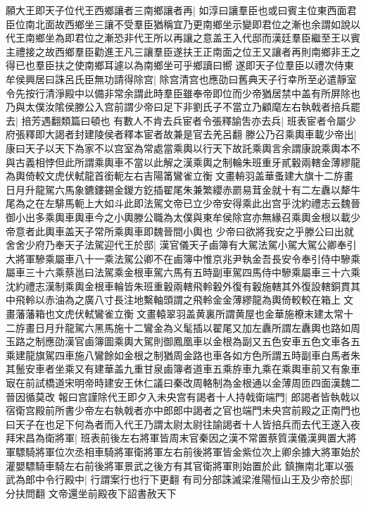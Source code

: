 願大王即天子位代王西鄉讓者三南鄉讓者再|{
	如淳曰讓羣臣也或曰賓主位東西面君臣位南北面故西鄉坐三讓不受羣臣猶稱宜乃更南鄉坐示變即君位之漸也余謂如說以代王南鄉坐為即君位之漸恐非代王所以再讓之意盖王入代邸而漢廷羣臣繼至王以賓主禮接之故西鄉羣臣勸進王凡三讓羣臣遂扶王正南面之位王又讓者再則南鄉非王之得已也羣臣扶之使南鄉耳遽以為南鄉坐可乎鄉讀曰嚮}
遂即天子位羣臣以禮次侍東牟侯興居曰誅呂氏臣無功請得除宫|{
	除宫清宫也應劭曰舊典天子行幸所至必遣靜室令先按行清淨殿中以備非常余謂此時羣臣雖奉帝即位而少帝猶居禁中盖有所屏除也}
乃與太僕汝隂侯滕公入宫前謂少帝曰足下非劉氏子不當立乃顧麾左右執戟者掊兵罷去|{
	掊芳遇翻類篇曰頓也}
有數人不肯去兵宦者令張釋諭吿亦去兵|{
	班表宦者令屬少府張釋即大謁者封建陵侯者釋本宦者故兼是官去羌呂翻}
滕公乃召乘輿車載少帝出|{
	康曰天子以天下為家不以宫室為常處當乘輿以行天下故託乘輿言余謂康說乘輿本不與古義相悖但此所謂乘輿車不當以此解之漢乘輿之制輪朱班重牙貳轂兩轄金薄繆龍為輿倚較文虎伏軾龍首銜軛左右吉陽筩鸞雀立衡文畫輈羽盖華蚤建大旗十二斿畫日月升龍駕六馬象鑣鏤錫金鍐方釳插翟尾朱兼繁纓赤罽易茸金就十有二左纛以犛牛尾為之在左騑馬軛上大如斗此即法駕文帝已立少帝安得乘此出宫乎沈約禮志云魏晉御小出多乘輿車輿車今之小輿滕公職為太僕與東牟侯除宫亦無緣召乘輿金根以載少帝意者此輿車盖天子常所乘輿車即魏晉間小輿也}
少帝曰欲將我安之乎滕公曰出就舍舍少府乃奉天子法駕迎代王於邸|{
	漢官儀天子鹵簿有大駕法駕小駕大駕公卿奉引大將軍驂乘屬車八十一乘法駕公卿不在鹵簿中惟京兆尹執金吾長安令奉引侍中驂乘屬車三十六乘蔡邕曰法駕乘金根車駕六馬有五時副車駕四馬侍中驂乘屬車三十六乘沈約禮志漢制乘輿金根車輪皆朱班重轂兩轄飛軨轂外復有轂施轄其外復設轄銅貫其中飛軨以赤油為之廣八寸長注地繫軸頭謂之飛軨金金薄繆龍為輿倚較較在箱上文畫藩藩箱也文虎伏軾鸞雀立衡文畫轅翠羽盖黄裏所謂黄屋也金華施橑末建太常十二斿畫日月升龍駕六黑馬施十二鸞金為义髦插以翟尾又加左纛所謂左纛輿也路如周玉路之制應劭漢官鹵簿圖乘輿大駕則御鳳凰車以金根為副又五色安車五色文車各五乘建龍旗駕四車施八鸞餘如金根之制猶周金路也車各如方色所謂五時副車白馬者朱其鬛安車者坐乘又有建華盖九重甘泉鹵簿者道車五乘斿車九乘在乘輿車前又有象車㝡在前試橋道宋明帝時建安王休仁議曰秦改周輅制為金根通以金薄周匝四面漢魏二晉因循莫改}
報曰宫謹除代王即夕入未央宫有謁者十人持戟衛端門|{
	郎謁者皆執戟以宿衛宫殿前所書少帝左右執戟者亦中郎郎中謁者之官也端門未央宫前殿之正南門也}
曰天子在也足下何為者而入代王乃謂太尉太尉往諭謁者十人皆掊兵而去代王遂入夜拜宋昌為衛將軍|{
	班表前後左右將軍皆周末官秦因之漢不常置蔡質漢儀漢興置大將軍驃騎將軍位次丞相車騎將軍衛將軍左右前後將軍皆金紫位次上卿余據大將軍始於灌嬰驃騎車騎左右前後將軍景武之後方有其官衛將軍則始置於此}
鎮撫南北軍以張武為郎中令行殿中|{
	行謂案行也行下更翻}
有司分部誅滅梁淮陽恒山王及少帝於邸|{
	分扶問翻}
文帝還坐前殿夜下詔書赦天下

